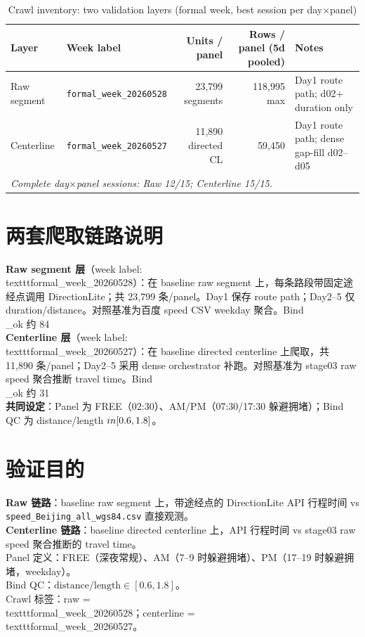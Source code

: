 \documentclass[12pt]{article}
\begin{document}
\begin{table}[h!]
\centering
\caption{Crawl inventory: two validation layers (formal week, best session per day$\times$panel)}
\label{tab:crawl_inventory}
\footnotesize
\begin{tabular}{llrrl}
\toprule
Layer & Week label & Units / panel & Rows / panel (5d pooled) & Notes \\
\midrule
Raw segment & \texttt{formal\_week\_20260528} & 23,799 segments & 118,995 max & Day1 route path; d02+ duration only \\
Centerline & \texttt{formal\_week\_20260527} & 11,890 directed CL & 59,450 & Day1 route path; dense gap-fill d02--d05 \\
\multicolumn{5}{l}{\textit{Complete day$\times$panel sessions: Raw 12/15; Centerline 15/15.}} \\
\bottomrule
\end{tabular}
\end{table}

\section*{两套爬取链路说明}

\textbf{Raw segment 层}（week label: \\texttt{formal\_week\_20260528}）：在 baseline raw segment 上，每条路段带固定途经点调用 DirectionLite；共 23,799 条/panel。Day1 保存 route path；Day2--5 仅 duration/distance。对照基准为百度 speed CSV weekday 聚合。Bind\\_ok 约 84\\%
\textbf{Centerline 层}（week label: \\texttt{formal\_week\_20260527}）：在 baseline directed centerline 上爬取，共 11,890 条/panel；Day2--5 采用 dense orchestrator 补跑。对照基准为 stage03 raw speed 聚合推断 travel time。Bind\\_ok 约 31\\%
\textbf{共同设定}：Panel 为 FREE（02:30）、AM/PM（07:30/17:30 躲避拥堵）；Bind QC 为 distance/length $\\in [0.6,1.8]$。

\section*{验证目的}

\textbf{Raw 链路}：baseline raw segment 上，带途经点的 DirectionLite API 行程时间 vs \texttt{speed\_Beijing\_all\_wgs84.csv} 直接观测。\\
\textbf{Centerline 链路}：baseline directed centerline 上，API 行程时间 vs stage03 raw speed 聚合推断的 travel time。\\
Panel 定义：FREE（深夜常规）、AM（7--9 时躲避拥堵）、PM（17--19 时躲避拥堵，weekday）。\\
Bind QC：$\mathrm{distance}/\mathrm{length}\in[0.6,1.8]$。\\
Crawl 标签：raw = \\texttt{formal\_week\_20260528}；centerline = \\texttt{formal\_week\_20260527}。
\end{document}
